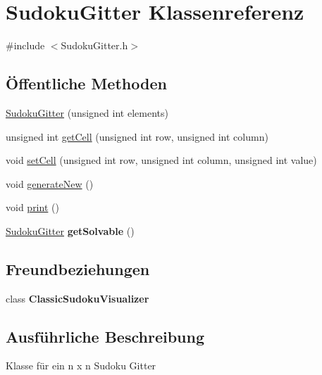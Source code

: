 \hypertarget{class_sudoku_gitter}{\section{Sudoku\-Gitter Klassenreferenz}
\label{class_sudoku_gitter}
}


{\ttfamily \#include $<$Sudoku\-Gitter.\-h$>$}

\subsection*{Öffentliche Methoden}
\begin{DoxyCompactItemize}
\item 
\hyperlink{class_sudoku_gitter_ad3443d5846cba4cef8fdfebc46f16c0b}{Sudoku\-Gitter} (unsigned int elements)
\item 
unsigned int \hyperlink{class_sudoku_gitter_a588e1738f938570014ab104a834f9a89}{get\-Cell} (unsigned int row, unsigned int column)
\item 
void \hyperlink{class_sudoku_gitter_aa7fa54638ade311994bd8f6433df8ff0}{set\-Cell} (unsigned int row, unsigned int column, unsigned int value)
\item 
void \hyperlink{class_sudoku_gitter_a1cd2a95fea6f56d295fcc4bb11412c2e}{generate\-New} ()
\item 
void \hyperlink{class_sudoku_gitter_a771332a8a5eff5e1917538adfb237d0e}{print} ()
\item 
\hypertarget{class_sudoku_gitter_ad089a50f3435a3eb025aacab74b8fbed}{\hyperlink{class_sudoku_gitter}{Sudoku\-Gitter} {\bfseries get\-Solvable} ()}\label{class_sudoku_gitter_ad089a50f3435a3eb025aacab74b8fbed}

\end{DoxyCompactItemize}
\subsection*{Freundbeziehungen}
\begin{DoxyCompactItemize}
\item 
\hypertarget{class_sudoku_gitter_a3f8b3753aa8e1441912c8724f574e730}{class {\bfseries Classic\-Sudoku\-Visualizer}}\label{class_sudoku_gitter_a3f8b3753aa8e1441912c8724f574e730}

\end{DoxyCompactItemize}


\subsection{Ausführliche Beschreibung}
Klasse für ein n x n Sudoku Gitter 

